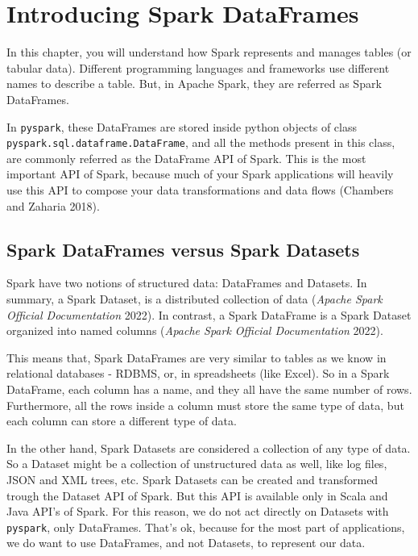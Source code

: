 \documentclass[
  11pt,
  letterpaper,
  DIV=11,
  numbers=noendperiod]{scrreprt}
\begin{document}

\chapter{Introducing Spark DataFrames}\label{sec-dataframes-chapter}

In this chapter, you will understand how Spark represents and manages
tables (or tabular data). Different programming languages and frameworks
use different names to describe a table. But, in Apache Spark, they are
referred as Spark DataFrames.

In \texttt{pyspark}, these DataFrames are stored inside python objects
of class \texttt{pyspark.sql.dataframe.DataFrame}, and all the methods
present in this class, are commonly referred as the DataFrame API of
Spark. This is the most important API of Spark, because much of your
Spark applications will heavily use this API to compose your data
transformations and data flows (Chambers and Zaharia 2018).

\section{Spark DataFrames versus Spark
Datasets}\label{spark-dataframes-versus-spark-datasets}

Spark have two notions of structured data: DataFrames and Datasets. In
summary, a Spark Dataset, is a distributed collection of data
(\emph{Apache Spark Official Documentation} 2022). In contrast, a Spark
DataFrame is a Spark Dataset organized into named columns (\emph{Apache
Spark Official Documentation} 2022).

This means that, Spark DataFrames are very similar to tables as we know
in relational databases - RDBMS, or, in spreadsheets (like Excel). So in
a Spark DataFrame, each column has a name, and they all have the same
number of rows. Furthermore, all the rows inside a column must store the
same type of data, but each column can store a different type of data.

In the other hand, Spark Datasets are considered a collection of any
type of data. So a Dataset might be a collection of unstructured data as
well, like log files, JSON and XML trees, etc. Spark Datasets can be
created and transformed trough the Dataset API of Spark. But this API is
available only in Scala and Java API's of Spark. For this reason, we do
not act directly on Datasets with \texttt{pyspark}, only DataFrames.
That's ok, because for the most part of applications, we do want to use
DataFrames, and not Datasets, to represent our data.
\end{document}
